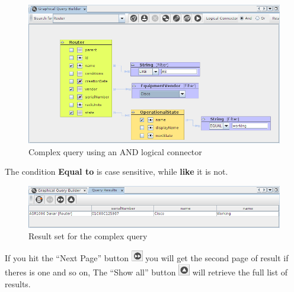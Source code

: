 \documentclass[a4paper]{article}
\begin{document}
	\begin{figure}[h!]
		\centering
		\includegraphics[width=1.1\linewidth]{img/query_example_2.png}
		\caption{Complex query using an AND logical connector}
		\label{fig:query_example_2}
	\end{figure}
	
	The condition \textbf{Equal to} is case sensitive, while \textbf{like} it is not.
	\begin{figure}[h!]
		\centering
		\includegraphics[width=1.1\linewidth]{img/query_example_2_results.png}
		\caption{Result set for the complex query}
		\label{fig:query_example_2_results}
	\end{figure}
	If you hit the “Next Page” button \includegraphics[width=0.5cm]{img/icon_next_page.png} you will get the second page of result if theres is one and so on, The “Show all” button \includegraphics[width=0.5cm]{img/icon_retrieve_all.png} will retrieve the full list of results.
	
\end{document}
